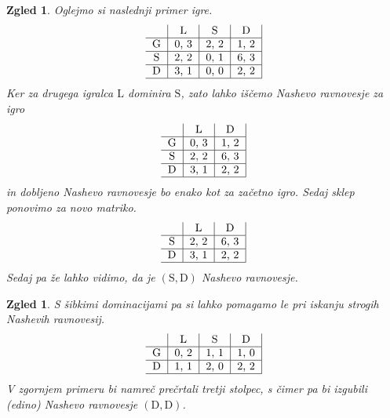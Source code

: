 \documentclass[10pt, a4paper]{article}
\newtheorem{zgled}[izr]{Zgled}
\begin{document}
\begin{zgled}
  Oglejmo si naslednji primer igre.
  $$
      \begin{tabular}{c|c|c|c|}
    & \textrm{L} & \textrm{S} & \textrm{D}\\
    \hline
    \textrm{G} & 0, 3 & 2, 2 & 1, 2\\
    \hline
    \textrm{S} & 2, 2 & 0, 1 & 6, 3\\
    \hline
    \textrm{D} & 3, 1 & 0, 0 & 2, 2\\
    \hline
  \end{tabular}
  $$
  Ker za drugega igralca $\mathrm{L}$ dominira $\mathrm{S}$, zato lahko iščemo Nashevo ravnovesje za igro
  $$
      \begin{tabular}{c|c|c|}
    & \textrm{L} & \textrm{D}\\
    \hline
    \textrm{G} & 0, 3 & 1, 2\\
    \hline
    \textrm{S} & 2, 2 & 6, 3\\
    \hline
    \textrm{D} & 3, 1 & 2, 2\\
    \hline
  \end{tabular}
  $$
  in dobljeno Nashevo ravnovesje bo enako kot za začetno igro. Sedaj sklep ponovimo za novo matriko.
  $$
      \begin{tabular}{c|c|c|}
    & \textrm{L} & \textrm{D}\\
    \hline
    \textrm{S} & 2, 2 & 6, 3\\
    \hline
    \textrm{D} & 3, 1 & 2, 2\\
    \hline
  \end{tabular}
  $$
  Sedaj pa že lahko vidimo, da je $(\textrm{S}, \textrm{D})$ Nashevo ravnovesje.
\end{zgled}

\begin{zgled}
  S šibkimi dominacijami pa si lahko pomagamo le pri iskanju strogih Nashevih ravnovesij.
  $$
  \begin{tabular}{c|c|c|c|}
    & \textrm{L} & \textrm{S} & \textrm{D}\\
    \hline
    \textrm{G} & 0, 2 & 1, 1 & 1, 0\\
    \hline
    \textrm{D} & 1, 1 & 2, 0 & 2, 2\\
    \hline
  \end{tabular}
  $$
  V zgornjem primeru bi namreč prečrtali tretji stolpec, s čimer pa bi izgubili (edino)
  Nashevo ravnovesje $(\mathrm{D}, \mathrm{D})$.
\end{zgled}
\end{document}

